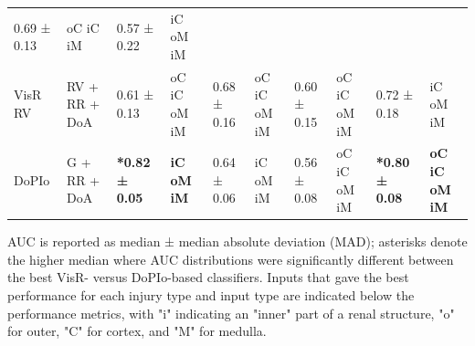 \begin{landscape}
\begin{longtable}{
        p{0.50in} 
        p{0.90in} | 
        w{r}{0.70in} w{l}{0.75in} | 
        w{r}{0.70in} w{l}{0.75in} | 
        w{r}{0.70in} w{l}{0.75in} | 
        w{r}{0.70in} w{l}{0.75in}}
        0.69 ± 0.13 & oC iC iM &
        0.57 ± 0.22 & iC oM iM \\
        VisR RV & RV + RR + DoA &
        0.61 ± 0.13 & oC iC oM iM &
        0.68 ± 0.16 & oC iC oM iM &
        0.60 ± 0.15 & oC iC oM iM &
        0.72 ± 0.18 & iC oM iM \\
        DoPIo & G + RR + DoA &
        \textbf{*0.82 ± 0.05} & \textbf{iC oM iM} &
        0.64 ± 0.06 & iC oM iM &
        0.56 ± 0.08 & oC iC oM iM &
        \textbf{*0.80 ± 0.08} & \textbf{oC iC oM iM} \\ 
        \bottomrule
    \end{longtable}
    \par\vspace{0.5em}
    \noindent{}AUC is reported as median ± median absolute deviation (MAD); asterisks denote the higher median where AUC distributions were significantly different between the best VisR- versus DoPIo-based classifiers. Inputs that gave the best performance for each injury type and input type are indicated below the performance metrics, with "i" indicating an "inner" part of a renal structure, "o" for outer, "C" for cortex, and "M" for medulla.
\end{landscape}
